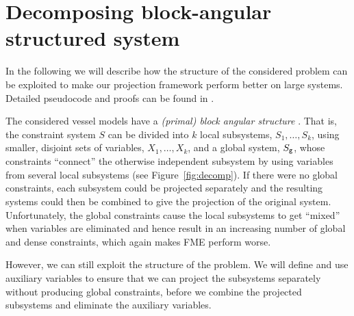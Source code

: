 

\section{Decomposing block-angular structured system}
In the following we will describe how the structure of the considered problem can be exploited to make our projection framework perform better on large systems. Detailed pseudocode and proofs can be found in \cite{MyTechRep}. 

The considered vessel models have a \emph{(primal) block angular structure} \cite{williams}. That is, the constraint system $S$ can be divided into $k$ local subsystems, $S_1, \ldots, S_k$, using smaller, disjoint sets of variables, $X_1, \ldots, X_k$, and a global system, $S_{\texttt{g}}$, whose constraints ``connect'' the otherwise independent subsystem by using variables from several local subsystems (see Figure~\ref{fig:decomp}). 
%
If there were no global constraints, each subsystem could be projected separately and the resulting systems could then be combined to give the projection of the original system. 
Unfortunately, the global constraints cause the local subsystems to get ``mixed'' when variables are eliminated and hence result in an increasing number of global and dense constraints, which again makes FME perform worse.

However, we can still exploit the structure of the problem. We will define and use auxiliary variables to ensure that we can project the subsystems separately without producing global constraints, before we combine the projected  subsystems and eliminate the auxiliary variables.
 

